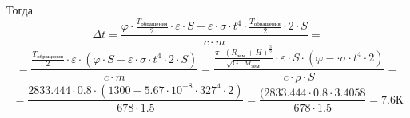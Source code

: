 \begin{enumerate}
    Тогда 
    $$\Delta t=\frac{\varphi\cdot\frac{T_\text{обращения}}{2}\cdot\varepsilon\cdot S-\varepsilon\cdot\sigma\cdot t^4\cdot\frac{T_\text{обращения}}{2}\cdot2\cdot S}{c\cdot m}=$$
    $$=\frac{\frac{T_\text{обращения}}{2}\cdot\varepsilon\cdot(\varphi\cdot S-\varepsilon\cdot\sigma\cdot t^4\cdot2\cdot S)}{c\cdot m}=\frac{\frac{\pi\cdot(R_\text{зем}+H)^{\frac{3}{2}}}{\sqrt{G\cdot M_\text{зем}}}\cdot\varepsilon\cdot S\cdot(\varphi-\cdot\sigma\cdot t^4\cdot2)}{c\cdot\rho\cdot S}=$$
    $$=\frac{2833.444\cdot0.8\cdot(1300-5.67\cdot10^{-8}\cdot327^4\cdot2)}{678\cdot1.5}=\frac{(2833.444\cdot0.8\cdot3.4058}{678\cdot1.5}=7.6 \text{К}$$
\end{enumerate}